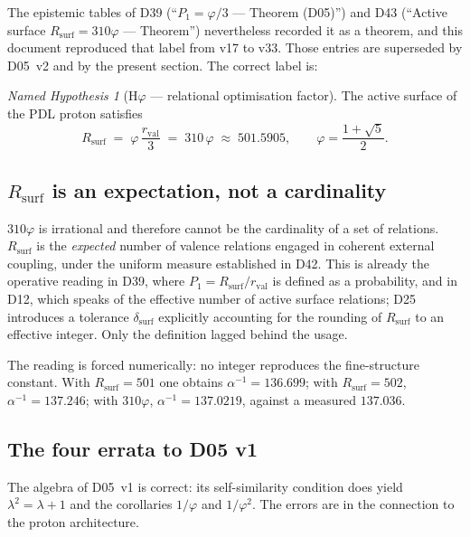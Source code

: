 \documentclass[11pt,a4paper]{article}
\theoremstyle{plain}
\theoremstyle{definition}
\theoremstyle{remark}
\newtheorem{namedhyp}[theorem]{Named Hypothesis}
\newcommand{\rval}{r_{\mathrm{val}}}
\newcommand{\Rsurf}{R_{\mathrm{surf}}}
\begin{document}
\textcolor{negativered}{The epistemic tables of D39 (``$P_1=\varphi/3$ --- Theorem (D05)'') and D43 (``Active surface $\Rsurf=310\varphi$ --- Theorem'') nevertheless recorded it as a theorem, and this document reproduced that label from v17 to v33.} Those entries are superseded by D05~v2 and by the present section. The correct label is:

\begin{namedhyp}[H$\varphi$ --- relational optimisation factor]
\label{hyp:Hphi}
The active surface of the PDL proton satisfies
\[
\Rsurf \;=\; \varphi\,\frac{\rval}{3} \;=\; 310\,\varphi \;\approx\; 501.5905,
\qquad \varphi=\frac{1+\sqrt5}{2}.
\]
\end{namedhyp}

\subsection{\texorpdfstring{$\Rsurf$}{Rsurf} is an expectation, not a cardinality}
\label{subsec:Rsurfexpectation}
$310\varphi$ is irrational and therefore cannot be the cardinality of a set of relations. $\Rsurf$ is the \emph{expected} number of valence relations engaged in coherent external coupling, under the uniform measure established in D42. This is already the operative reading in D39, where $P_1=\Rsurf/\rval$ is defined as a probability, and in D12, which speaks of the effective number of active surface relations; D25 introduces a tolerance $\delta_{\mathrm{surf}}$ explicitly accounting for the rounding of $\Rsurf$ to an effective integer. Only the definition lagged behind the usage.

The reading is forced numerically: no integer reproduces the fine-structure constant. With $\Rsurf=501$ one obtains $\alpha^{-1}=136.699$; with $\Rsurf=502$, $\alpha^{-1}=137.246$; with $310\varphi$, $\alpha^{-1}=137.0219$, against a measured $137.036$.

\subsection{The four errata to D05 v1}
\label{subsec:D05errata}
The algebra of D05~v1 is correct: its self-similarity condition does yield $\lambda^2=\lambda+1$ and the corollaries $1/\varphi$ and $1/\varphi^2$. The errors are in the connection to the proton architecture.
\end{document}
